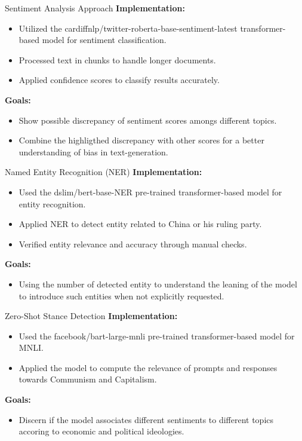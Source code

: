 \documentclass{beamer}
\begin{document}
\begin{frame}{Sentiment Analysis Approach}
    \textbf{Implementation:}
    \begin{itemize}
        \item Utilized the cardiffnlp/twitter-roberta-base-sentiment-latest transformer-based model for sentiment classification.
        \item Processed text in chunks to handle longer documents.
        \item Applied confidence scores to classify results accurately.
    \end{itemize}

    \textbf{Goals:}
    \begin{itemize}
        \item Show possible discrepancy of sentiment scores amongs different topics.
        \item Combine the highligthed discrepancy with other scores for a better understanding of bias in text-generation.
    \end{itemize}
\end{frame}

\begin{frame}{Named Entity Recognition (NER)}
    \textbf{Implementation:}
    \begin{itemize}
        \item Used the dslim/bert-base-NER pre-trained transformer-based model for entity recognition.
        \item Applied NER to detect entity related to China or his ruling party.
        \item Verified entity relevance and accuracy through manual checks.
    \end{itemize}
    
    \textbf{Goals:}
    \begin{itemize}
        \item Using the number of detected entity to understand the leaning of the model to introduce such entities when not explicitly requested.
    \end{itemize}
\end{frame}

\begin{frame}{Zero-Shot Stance Detection}
    \textbf{Implementation:}
    \begin{itemize}
        \item Used the facebook/bart-large-mnli pre-trained transformer-based model for MNLI.
        \item Applied the model to compute the relevance of prompts and responses towards Communism and Capitalism.
    \end{itemize}
    
    \textbf{Goals:}
    \begin{itemize}
        \item Discern if the model associates different sentiments to different topics accoring to economic and political ideologies.
    \end{itemize}
\end{frame}
\end{document}
